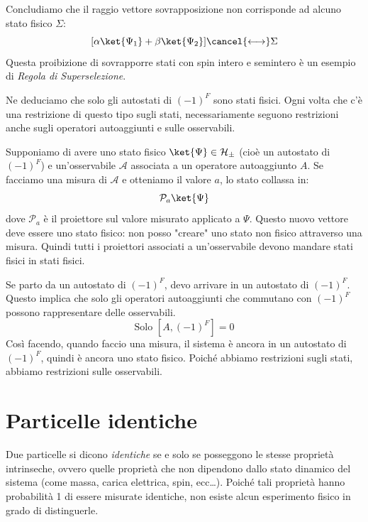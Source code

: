 \begin{attention}
    Concludiamo che il raggio vettore sovrapposizione non corrisponde ad alcuno stato fisico $\Sigma$:
    \[
        [\alpha \ket{\Psi_1} + \beta \ket{\Psi_2}]\cancel{\longleftrightarrow} \Sigma
    \]
    Questa proibizione di sovrapporre stati con spin intero e semintero è un esempio di \textit{Regola di Superselezione}.
\end{attention}
Ne deduciamo che solo gli autostati di \((-1)^F\) sono stati fisici.
Ogni volta che c'è una restrizione di questo tipo sugli stati, necessariamente seguono restrizioni anche sugli operatori autoaggiunti e sulle osservabili.

Supponiamo di avere uno stato fisico $\ket{\Psi} \in \mathcal{H}_{\pm}$ (cioè un autostato di $(-1)^F$) e un'osservabile $\mathcal{A}$ associata a un operatore autoaggiunto $A$.
Se facciamo una misura di $\mathcal{A}$ e otteniamo il valore $a$, lo stato collassa in:
\[
    \mathcal{P}_a \ket{\Psi}
\]
dove $\mathcal{P}_a$ è il proiettore sul valore misurato applicato a $\Psi$.
Questo nuovo vettore deve essere uno stato fisico: non posso "creare" uno stato non fisico attraverso una misura.
Quindi tutti i proiettori associati a un'osservabile devono mandare stati fisici in stati fisici.

Se parto da un autostato di $(-1)^F$, devo arrivare in un autostato di $(-1)^F$.
Questo implica che solo gli operatori autoaggiunti che commutano con $(-1)^F$ possono rappresentare delle osservabili.
\[
    \text{Solo } [A, (-1)^F] = 0
\]
Così facendo, quando faccio una misura, il sistema è ancora in un autostato di $(-1)^F$, quindi è ancora uno stato fisico.
Poiché abbiamo restrizioni sugli stati, abbiamo restrizioni sulle osservabili.





\section{Particelle identiche}

\begin{definition}
    Due particelle si dicono \textit{identiche} se e solo se posseggono le stesse proprietà intrinseche, ovvero quelle proprietà che non dipendono dallo stato dinamico del sistema (come massa, carica elettrica, spin, ecc\dots).
    Poiché tali proprietà hanno probabilità 1 di essere misurate identiche, non esiste alcun esperimento fisico in grado di distinguerle.
\end{definition}

